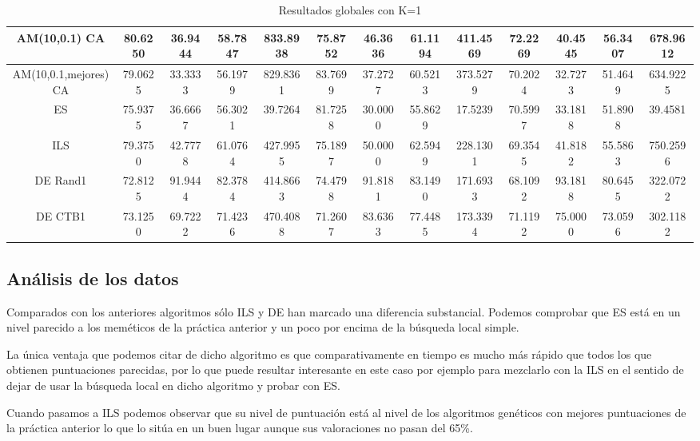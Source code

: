 \documentclass[12pt,a4paper]{article}
\begin{document}
\begin{table}[h!]
{\begin{tabular}{| c | c | c | c | c | c | c | c | c | c | c | c | c |}
				AM(10,0.1) CA & 80.6250 & 36.9444 & 58.7847 & 833.8938 & 75.8752 & 46.3636 & 61.1194 & 411.4569 & 72.2269 & 40.4545 & 56.3407 & 678.9612 \\ [0.5ex] \hline
				AM(10,0.1,mejores) CA & 79.0625 & 33.3333 & 56.1979 & 829.8361 & 83.7699 & 37.2727 & 60.5213 & 373.5279 & 70.2024 & 32.7273 & 51.4649 & 634.9225 \\ [0.5ex] \hline
				ES & 75.9375 & 36.6667 & 56.3021 & 39.7264 & 81.7258 & 30.0000 & 55.8629 & 17.5239 & 70.5997 & 33.1818 & 51.8908 & 39.4581 \\ [0.5ex] \hline
				ILS & 79.3750 & 42.7778 & 61.0764 & 427.9955 & 75.1897 & 50.0000 & 62.5949 & 228.1301 & 69.3545 & 41.8182 & 55.5863 & 750.2596 \\ [0.5ex] \hline
				DE Rand1 & 72.8125 & 91.9444 & 82.3784 & 414.8663 & 74.4798 & 91.8181 & 83.1490 & 171.6933 & 68.1092 & 93.1818 & 80.6455 & 322.0722 \\ [0.5ex] \hline
				DE CTB1 & 73.1250 & 69.7222 & 71.4236 & 470.4088 & 71.2607 & 83.6363 & 77.4485 & 173.3394 & 71.1192 & 75.0000 & 73.0596 & 302.1182 \\ [0.5ex] \hline
			\end{tabular}
		}
		\label{tablaGlobalK1}
		\caption{Resultados globales con K=1}
	\end{table}


	\newpage

	\subsection{Análisis de los datos}
	
	Comparados con los anteriores algoritmos sólo ILS y DE han marcado una diferencia substancial. Podemos comprobar que ES está en un nivel parecido a los meméticos de la práctica anterior y un poco por encima de la búsqueda local simple.
	
	La única ventaja que podemos citar de dicho algoritmo es que comparativamente en tiempo es mucho más rápido que todos los que obtienen puntuaciones parecidas, por lo que puede resultar interesante en este caso por ejemplo para mezclarlo con la ILS en el sentido de dejar de usar la búsqueda local en dicho algoritmo y probar con ES.
	
	Cuando pasamos a ILS podemos observar que su nivel de puntuación está al nivel de los algoritmos genéticos con mejores puntuaciones de la práctica anterior lo que lo sitúa en un buen lugar aunque sus valoraciones no pasan del 65\%. 
	
\end{document}
